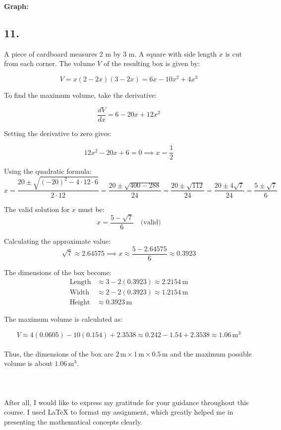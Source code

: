\documentclass[a4paper, 7pt]{article}
\begin{document}
\textbf{Graph:}
\begin{center}
\end{center}

\subsection*{11.}
A piece of cardboard measures 2 m by 3 m. A square with side length \( x \) is cut from each corner. The volume \( V \) of the resulting box is given by:

\[
V = x(2 - 2x)(3 - 2x) = 6x - 10x^2 + 4x^3
\]

To find the maximum volume, take the derivative:

\[
\frac{dV}{dx} = 6 - 20x +12x^2
\]

Setting the derivative to zero gives:

\[
12x^2 -20x + 6 = 0 \implies x = \frac{1}{2}
\]

Using the quadratic formula:
\[
x = \frac{20 \pm \sqrt{(-20)^2 - 4 \cdot 12 \cdot 6}}{2 \cdot 12} = \frac{20 \pm \sqrt{400 - 288}}{24} = \frac{20 \pm \sqrt{112}}{24} = \frac{20 \pm 4\sqrt{7}}{24} = \frac{5 \pm \sqrt{7}}{6}
\]

The valid solution for \( x \) must be:
\[
x = \frac{5 - \sqrt{7}}{6} \quad \text{(valid)}
\]

Calculating the approximate value:
\[
\sqrt{7} \approx 2.64575 \implies x \approx \frac{5 - 2.64575}{6} \approx 0.3923
\]

The dimensions of the box become:
\begin{align*}
    \text{Length} &\approx 3 - 2(0.3923) \approx 2.2154 \, \text{m} \\
    \text{Width} &\approx 2 - 2(0.3923) \approx 1.2154 \, \text{m} \\
    \text{Height} &\approx 0.3923 \, \text{m}
\end{align*}

The maximum volume is calculated as:

\[
V \approx 4(0.0605) - 10(0.154) + 2.3538 \approx 0.242 - 1.54 + 2.3538 \approx 1.06 \, \text{m}^3
\]\\


Thus, the dimensions of the box are \( 2 \, \text{m} \times 1 \, \text{m} \times 0.5 \, \text{m} \) and the maximum possible volume is about \( 1.06 \, \text{m}^3 \).\\ \\

\section*{}
After all, I would like to express my gratitude for your guidance throughout this course.
I used LaTeX to format my assignment, which greatly helped me in presenting the mathematical concepts clearly.
\end{document}
